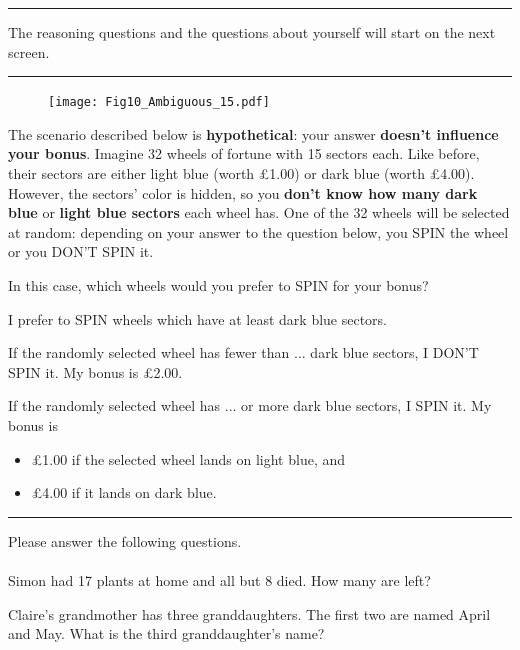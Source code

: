 \documentclass[pdftex,12pt, a4paper]{article}
\begin{document}
\noindent \rule{\linewidth}{0.4pt}

\newpage
The reasoning questions and the questions about yourself will start on the next screen.

\smallskip
\noindent \rule{\linewidth}{0.4pt}

\begin{figure}[h!]
	\centering
	{\texttt{[image: Fig10\_Ambiguous\_15.pdf]}}
\end{figure}

\noindent The scenario described below is \textbf{hypothetical}: your answer \textbf{doesn't influence your bonus}.
\smallskip
\noindent Imagine 32 wheels of fortune with 15 sectors each.
Like before, their sectors are either light blue (worth £1.00) or dark blue (worth £4.00).
However, the sectors' color is hidden, so you \textbf{don't know how many dark blue} or \textbf{light blue sectors} each wheel has.
One of the 32 wheels will be selected at random: depending on your answer to the question below, you SPIN the wheel or you DON'T SPIN it.
 
\noindent In this case, which wheels would you prefer to SPIN for your bonus?


\smallskip
\noindent I prefer to SPIN wheels which have at least \framebox[0.1\textwidth]{\rule{0pt}{15pt}} dark blue sectors.

\smallskip
\noindent If the randomly selected wheel has fewer than ... dark blue sectors, I DON'T SPIN it.
My bonus is £2.00.

\noindent If the randomly selected wheel has ... or more dark blue sectors, I SPIN it.
My bonus is
\begin{itemize}
\item £1.00 if the selected wheel lands on light blue, and
\item £4.00 if it lands on dark blue.
\end{itemize}

\noindent \rule{\linewidth}{0.4pt}

\newpage
\noindent Please answer the following questions.\\
\\
\noindent Simon had 17 plants at home and all but 8 died.
How many are left?\\
\framebox[0.1\textwidth]{\rule{0pt}{15pt}}

\noindent Claire's grandmother has three granddaughters.
The first two are named April and May.
What is the third granddaughter's name?\\
\framebox[0.1\textwidth]{\rule{0pt}{15pt}}
\end{document}
